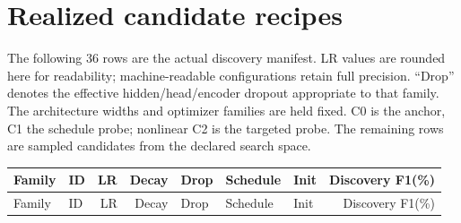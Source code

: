 \clearpage
\section{Realized candidate recipes}\label{app:recipes}
The following 36 rows are the actual discovery manifest. LR values are rounded here for readability; machine-readable configurations retain full precision. ``Drop'' denotes the effective hidden/head/encoder dropout appropriate to that family. The architecture widths and optimizer families are held fixed. C0 is the anchor, C1 the schedule probe; nonlinear C2 is the targeted probe. The remaining rows are sampled candidates from the declared search space.

\begin{center}\footnotesize
\begin{longtable}{llrrlllr}
\toprule
Family & ID & LR & Decay & Drop & Schedule & Init & Discovery F1(\%)\\
\midrule\endfirsthead
\toprule
Family & ID & LR & Decay & Drop & Schedule & Init & Discovery F1(\%)\\
\midrule\endhead


\end{longtable}
\end{center}

